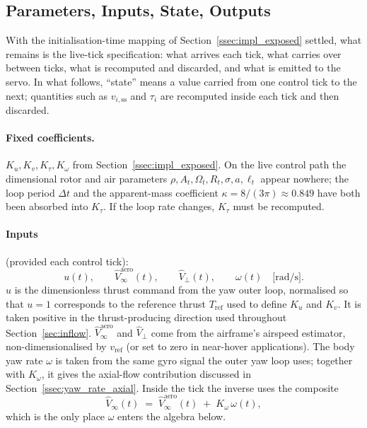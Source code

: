 \documentclass[11pt,a4paper]{article}
\newcommand{\OmegaT}{\Omega_t}
\newcommand{\Rt}{R_t}
\newcommand{\At}{A_t}
\newcommand{\viss}{v_{i,\text{ss}}}
\begin{document}
\subsection{Parameters, Inputs, State, Outputs}\label{ssec:impl_ios}

With the initialisation-time mapping of Section~\ref{ssec:impl_exposed} settled,
what remains is the live-tick specification: what arrives each tick,
what carries over between ticks, what is recomputed and discarded, and
what is emitted to the servo. In what follows, ``state'' means a value
carried from one control tick to the next; quantities such as \(\viss\)
and \(\tau_i\) are recomputed inside each tick and then discarded.

\paragraph{Fixed coefficients.}
\(K_u, K_v, K_\tau, K_\omega\) from Section~\ref{ssec:impl_exposed}. On the live
control path the dimensional rotor and air parameters
\(\rho, \At, \OmegaT, \Rt, \sigma, a, \ell_t\) appear nowhere; the loop
period \(\Delta t\) and the apparent-mass coefficient
\(\kappa=8/(3\pi)\approx 0.849\) have both been absorbed into \(K_\tau\).
If the loop rate changes, \(K_\tau\) must be recomputed.

\paragraph{Inputs} (provided each control tick):
\begin{equation}
u(t),\qquad
\hat V_\infty^{\text{aero}}(t),\qquad
\hat V_\perp(t),\qquad
\omega(t)\quad\text{[rad/s]}.
\end{equation}
\(u\) is the dimensionless thrust command from the yaw outer loop,
normalised so that \(u=1\) corresponds to the reference thrust
\(T_{\text{ref}}\) used to define \(K_u\) and \(K_v\). It is taken positive
in the thrust-producing direction used throughout
Section~\ref{sec:inflow}. \(\hat V_\infty^{\text{aero}}\) and
\(\hat V_\perp\) come from the airframe's airspeed estimator,
non-dimensionalised by \(v_{\text{ref}}\) (or set to zero in near-hover
applications). The body yaw rate \(\omega\) is taken from the same
gyro signal the outer yaw loop uses; together with \(K_\omega\), it gives the
axial-flow contribution discussed in Section~\ref{ssec:yaw_rate_axial}.
Inside the tick the inverse uses the composite
\begin{equation}
\hat V_\infty(t) \;=\; \hat V_\infty^{\text{aero}}(t) \;+\; K_\omega\,\omega(t),
\label{eq:impl_Vinf_composite}
\end{equation}
which is the only place \(\omega\) enters the algebra below.
\end{document}
